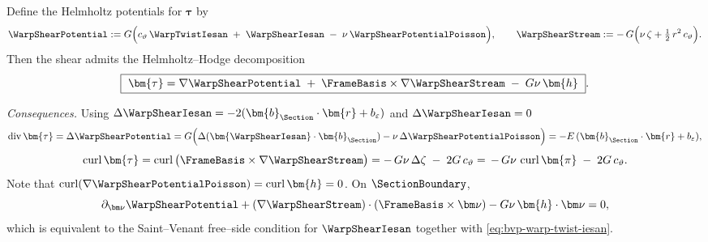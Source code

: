 Define the Helmholtz potentials for \(\bm{\tau}\) by
\[
\WarpShearPotential:=G\Big(c_{\vartheta}\,\WarpTwistIesan
\;+\;\WarpShearIesan
\;-\;\nu\,\WarpShearPotentialPoisson\Big),\qquad
\WarpShearStream:=-\,G\Big(\nu\,\zeta+\tfrac12\,r^2\,c_{\vartheta}\Big).
\]
Then the shear admits the Helmholtz–Hodge decomposition \citep{cantarella2002vector}
\[
\boxed{
\ \bm{\tau}=\nabla \WarpShearPotential
\;+\; \FrameBasis\times\nabla\WarpShearStream
\;-\;G\nu\,\bm{h}\ }.
\]

\noindent\emph{Consequences.}
Using \(\Delta\WarpShearIesan=-2(\bm{b}_{\Section}\cdot\bm{r}+b_\varepsilon)\) and \(\Delta \WarpShearIesan = 0\)
\[
\operatorname{div}\bm{\tau}
=\Delta\WarpShearPotential
=G\Big(\Delta(\bm{\WarpShearIesan}\cdot\bm{b}_{\Section})
-\nu\,\Delta\WarpShearPotentialPoisson\Big)
=-E\,(\bm{b}_{\Section}\cdot\bm{r}+b_\varepsilon),
\]
\[
\operatorname{curl}\bm{\tau}
=\operatorname{curl}\big(\FrameBasis\times\nabla\WarpShearStream\big)
=-\,G\nu\,\Delta\zeta\;-\;2G\,c_{\vartheta}
=\,-\,G\nu\,\operatorname{curl}\bm{\pi}\;-\;2G\,c_{\vartheta}.
\]
Note that \(\operatorname{curl}(\nabla \WarpShearPotentialPoisson)=\operatorname{curl} \bm{h}=0\). On \(\SectionBoundary\),
\[
\partial_{\bm\nu}\WarpShearPotential
+(\nabla\WarpShearStream)\cdot(\FrameBasis\times\bm\nu)
-G\nu\,\bm{h}\cdot\bm\nu
=0,
\]
which is equivalent to the Saint–Venant free–side condition for \(\WarpShearIesan\) together with \eqref{eq:bvp-warp-twist-iesan}.
